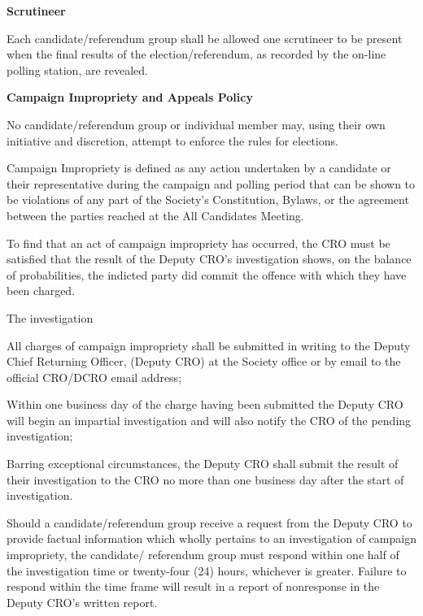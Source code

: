 \begin{longenum}[ label*=\thesection.\arabic*., align=left]
 \item \textbf{Scrutineer}
 \begin{longenum}[label*=\arabic*., align=left]
\item Each candidate/referendum group shall be allowed one scrutineer to be present when the final results of the election/referendum, as recorded by the on-line polling station, are revealed.
 \end{longenum}
 \item 	\textbf{Campaign Impropriety and Appeals Policy}	
 \begin{longenum}[label*=\arabic*., align=left]
\item No candidate/referendum group or individual member may, using their own initiative and 
discretion, attempt to enforce the rules for elections.
\item Campaign Impropriety is defined as any action undertaken by a candidate or their representative 
during the campaign and polling period that can be shown to be violations of any part of the Society's 
Constitution, Bylaws, or the agreement between the parties reached at the All Candidates Meeting.
\item To find that an act of campaign impropriety has occurred, the CRO must be satisfied that the result of 
the Deputy CRO's investigation shows, on the balance of probabilities, the indicted party did commit the 
offence with which they have been charged.
\item The investigation
\begin{longenum}[label*=\arabic*., align=left]
\item All charges of campaign impropriety shall be submitted in writing to the Deputy Chief Returning Officer, (Deputy CRO) at the Society office or by email to the official CRO/DCRO email address;
\item Within one business day of the charge having been submitted the Deputy CRO will begin an impartial investigation and will also notify the CRO of the pending investigation; 
\item Barring exceptional circumstances, the Deputy CRO shall submit the result of their investigation to the CRO no more than one business day after the start of investigation.
\end{longenum}
\item Should a candidate/referendum group receive a request from the Deputy CRO to provide factual information which wholly pertains to an investigation of campaign impropriety, the candidate/ referendum group must respond within one half of the investigation time or twenty-four (24) hours, whichever is greater. Failure to respond within the time frame will result in a report of nonresponse in the Deputy CRO's written report.

\end{longenum}
\end{longenum}
